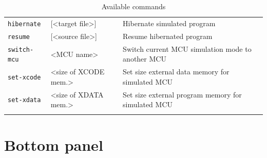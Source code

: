 \documentclass[a4paper,twoside,12pt]{book}
\begin{document}
{\begin{longtable}{l|ll}
				\texttt{hibernate}	& [<target file>]	& Hibernate simulated program				\\
				\texttt{resume}		& [<source file>]	& Resume hibernated program				\\
				\texttt{switch-mcu}	& <MCU name>		& Switch current MCU simulation mode to another MCU	\\
				\texttt{set-xcode}	& <size of XCODE mem.>	& Set size external data memory for simulated MCU	\\
				\texttt{set-xdata}	& <size of XDATA mem.>	& Set size external program memory for simulated MCU	\\
				\caption{Available commands}
			\end{longtable}
			}

	\section{Bottom panel}
\end{document}
